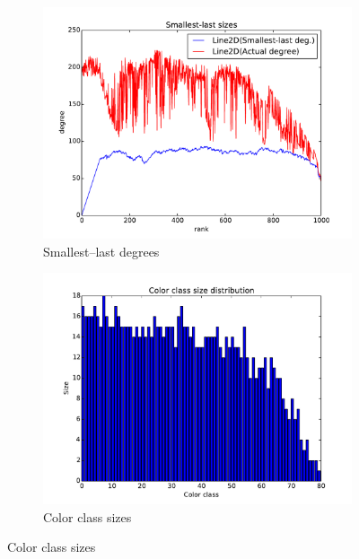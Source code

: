 \documentclass[oneside, titlepage]{scrartcl}
\begin{document}
\begin{figure}[!h]
\begin{subfigure}{0.5\textwidth}
	\centering
	\includegraphics[width=0.9\linewidth]{figures/ordering50.pdf}
	\caption{Smallest--last degrees}
\end{subfigure}%
\begin{subfigure}{0.5\textwidth}
	\centering
	\includegraphics[width=0.9\linewidth]{figures/colors50.pdf}
	\caption{Color class sizes}
\end{subfigure}


\end{figure}
\end{document}
